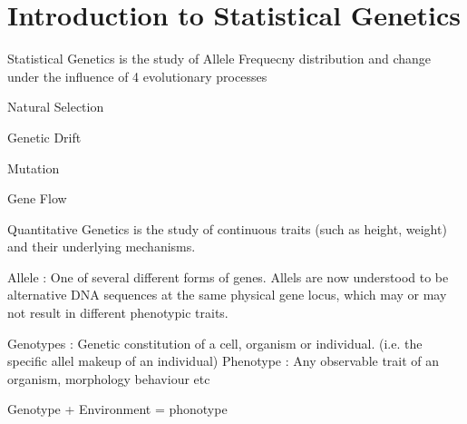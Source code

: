 \section{Introduction to Statistical Genetics}

Statistical Genetics is the study of Allele Frequecny distribution and change under the influence of 4 evolutionary processes

\begin{enumeration}
\item Natural Selection
\item Genetic Drift
\item Mutation
\item Gene Flow
\end{enumeration}

Quantitative Genetics is the study of continuous traits (such as height, weight) and their underlying mechanisms.

Allele : One of several different forms of genes. Allels are now understood to be alternative DNA sequences at the same physical gene locus, which may or may not
result in different phenotypic traits.

Genotypes : Genetic constitution of a cell, organism or individual. (i.e. the specific allel makeup of an individual)
Phenotype : Any observable trait of an organism, morphology behaviour etc

Genotype +  Environment = phonotype
